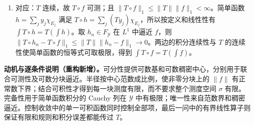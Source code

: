 \documentclass[../../main.tex]{subfiles}
\begin{document}
\begin{solution}
\begin{enumerate}
此极限可测：对可数稠密集中的每个 $y_j$，距离函数 $\|f_n-y_j\|$ 逐点趋于 $\|\widetilde f-y_j\|$，故后者实值可测。以稠密中心和正有理半径作可数基，每个基球的原像可测；每个开集是这些基球的可数并，所以 $\widetilde f$ Borel 可测。又 $\|\widetilde f\|\le g$ 几乎处处，故属于 $L_{\mathcal Y}^1$。标量控制收敛定理应用于 $\|f_n-\widetilde f\|$，它几乎处处趋零且至多 $2|g|$，得到 $\|f_n-\widetilde f\|_1\to0$。于是
\begin{align*}
\left\|\int f_n-\int\widetilde f\right\|\le\|f_n-\widetilde f\|_1\longrightarrow0.
\end{align*}
若给定的 $f$ 本来可测，则与 $\widetilde f$ 几乎处处相等，积分相同；一般则用这个可测代表解释 $\int f$。
\item 对应：$T$ 连续，故 $T\circ f$ 可测；且 $\|T\circ f\|_1\le\|T\|\|f\|_1<\infty$。简单函数 $h=\sum_jy_j\chi_{E_j}$ 满足 $T\circ h=\sum_j(Ty_j)\chi_{E_j}$，所以按定义和线性性有 $\int T\circ h=T(\int h)$。取 $h_n\in F_{\mathcal Y}$ 在 $L^1$ 中逼近 $f$，则 $\|T\circ h_n-T\circ f\|_1\le\|T\|\|h_n-f\|_1\to0$。两边的积分连续性与 $T$ 的连续性使简单函数的恒等式可取极限，得到 $\int T\circ f=T(\int f)$。
\end{enumerate}
\end{solution}
\begin{remark}
\textbf{动机与逐条件说明（重构新增）。}可分性提供可数基和可数稠密中心，分别用于联合可测性及可数分块逼近。半径按中心范数成比例，使非零分块上的 $\|f\|$ 有正常数下界；结合可积性才得到每一块测度有限，而不要求整个测度空间 $\sigma$ 有限。完备性用于简单函数积分的 Cauchy 列在 $\mathcal Y$ 中有极限；唯一性来自范数界和稠密逼近。控制收敛中的单一可积函数同时控制全部项，最后一问中的有界线性算子则保证有限和规则和积分误差都能传过 $T$。
\end{remark}
\end{document}
